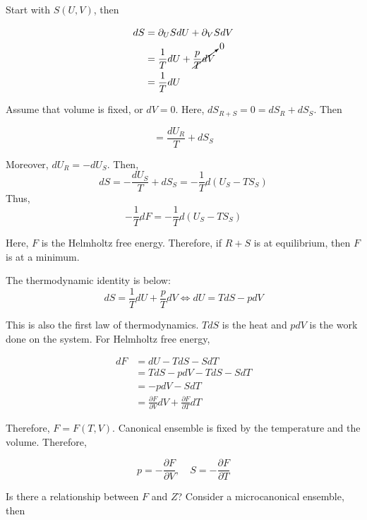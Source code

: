 \documentclass{article}
\newtheorem{one minute paper}[theorem]{One Minute Paper}
\begin{document}
Start with $S(U,V)$, then 

\begin{align}
    dS &= \partial_{U}S dU + \partial_V S dV \\
    &= \frac{1}{T}dU + \cancelto{0}{\frac{p}{T}dV}\\
    &= \frac{1}{T}dU
\end{align}

Assume that volume is fixed, or $dV = 0$. Here, $dS_{R + S} = 0 = dS_R + dS_S$. Then 

\begin{equation}
    = \frac{dU_R}{T} + dS_S
\end{equation}

Moreover, $dU_R = -dU_S$. Then, 
\begin{equation}
    dS = -\frac{dU_S}{T} + dS_S = -\frac{1}{T}d\left(U_S - TS_S\right)
\end{equation}
Thus, 
\begin{equation}
    -\frac{1}{T}dF = -\frac{1}{T}d\left( U_S - TS_S \right)
\end{equation}

Here, $F$ is the Helmholtz free energy. Therefore, if $R + S$ is at equilibrium, then $F$ is at a minimum. 

The thermodynamic identity is below:
\begin{equation}
    dS = \frac{1}{T}dU + \frac{p}{T}dV \iff dU = TdS - pdV
\end{equation}

This is also the first law of thermodynamics. $TdS$ is the heat and $pdV$ is the work done on the system. For Helmholtz free energy, 

\begin{align}
    dF &= dU - TdS - SdT \\
    &= TdS - pdV - TdS - SdT \\
    &= -pdV - SdT \\
    &= \frac{\partial F}{\partial V}dV + \frac{\partial F}{\partial T}dT
\end{align}

Therefore, $F = F(T,V)$. Canonical ensemble is fixed by the temperature and the volume. Therefore, 

\begin{equation}
    p = -\frac{\partial F}{\partial V}, \quad S = -\frac{\partial F}{\partial T}
\end{equation}

Is there a relationship between $F$ and $Z$? Consider a microcanonical ensemble, then 
\end{document}
